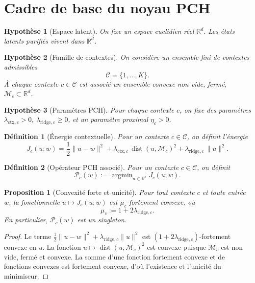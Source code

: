 \documentclass[11pt,a4paper]{article}
\newtheorem{definition}{Définition}[section]
\newtheorem{assumption}{Hypothèse}[section]
\newtheorem{proposition}{Proposition}[section]
\DeclareMathOperator{\argmin}{argmin}
\DeclareMathOperator{\dist}{dist}
\newcommand{\R}{\mathbb R}
\newcommand{\Mcal}{\mathcal M}
\newcommand{\Ccal}{\mathcal C}
\newcommand{\Pcal}{\mathcal P}
\begin{document}
\section{Cadre de base du noyau PCH}

\begin{assumption}[Espace latent]
On fixe un espace euclidien réel \(\R^d\). Les états latents purifiés vivent dans \(\R^d\).
\end{assumption}

\begin{assumption}[Famille de contextes]
On considère un ensemble fini de contextes admissibles
\[
\Ccal = \{1,\dots,K\}.
\]
À chaque contexte \(c\in\Ccal\) est associé un ensemble convexe non vide, fermé, \(\Mcal_c\subset\R^d\).
\end{assumption}

\begin{assumption}[Paramètres PCH]
Pour chaque contexte \(c\), on fixe des paramètres \(\lambda_{\mathrm{ctx},c}>0\), \(\lambda_{\mathrm{ridge},c}\ge 0\), et un paramètre proximal \(\eta_c>0\).
\end{assumption}

\begin{definition}[Énergie contextuelle]
Pour un contexte \(c\in\Ccal\), on définit l'énergie
\[
J_c(u;w)
=
\frac12\|u-w\|^2
+
\lambda_{\mathrm{ctx},c}\,\dist(u,\Mcal_c)^2
+
\lambda_{\mathrm{ridge},c}\,\|u\|^2.
\]
\end{definition}

\begin{definition}[Opérateur PCH associé]
Pour un contexte \(c\in\Ccal\), on définit
\[
\Pcal_c(w)
:=
\argmin_{u\in\R^d} J_c(u;w).
\]
\end{definition}

\begin{proposition}[Convexité forte et unicité]
Pour tout contexte \(c\) et toute entrée \(w\), la fonctionnelle \(u\mapsto J_c(u;w)\) est \(\mu_c\)-fortement convexe, où
\[
\mu_c:=1+2\lambda_{\mathrm{ridge},c}.
\]
En particulier, \(\Pcal_c(w)\) est un singleton.
\end{proposition}

\begin{proof}
Le terme \(\frac12\|u-w\|^2+\lambda_{\mathrm{ridge},c}\|u\|^2\) est \((1+2\lambda_{\mathrm{ridge},c})\)-fortement convexe en \(u\). La fonction \(u\mapsto \dist(u,\Mcal_c)^2\) est convexe puisque \(\Mcal_c\) est non vide, fermé et convexe. La somme d'une fonction fortement convexe et de fonctions convexes est fortement convexe, d'où l'existence et l'unicité du minimiseur.
\end{proof}
\end{document}
